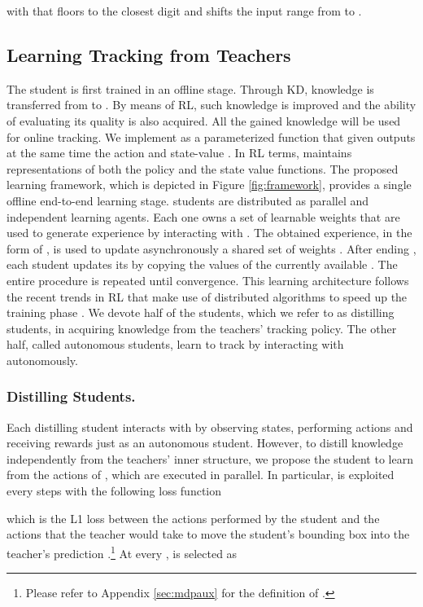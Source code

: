 \documentclass[runningheads]{llncs}
\begin{document}
with
 that
floors to the closest  digit and shifts the input range from  to . 
 
\subsection{Learning Tracking from Teachers}
The student  is first trained in an offline stage. Through KD, knowledge is transferred from  to . By means of RL, such knowledge is improved and the ability of evaluating its quality is also acquired. All the gained knowledge will be used for online tracking.
We implement  as a parameterized function  that given  outputs at the same time the action  and state-value . In RL terms,  maintains representations of both the policy  and the state value   functions. 
The proposed learning framework, which is depicted in Figure \ref{fig:framework}, provides a single offline end-to-end learning stage. 
 students are distributed as parallel and independent learning agents. Each one owns a set of learnable weights  that are used to generate experience by interacting with . The obtained experience,
in the form of , is used to update asynchronously a shared set of weights . After ending , each student updates its  by copying the values of the currently available . The entire procedure is repeated until convergence. This learning architecture follows the recent trends in RL that make use of distributed algorithms to speed up the training phase \cite{Gorila,Mnih2016,IMPALA}. 
We devote half of the students, which we refer to as distilling students, in acquiring knowledge from the teachers' tracking policy. The other half, called autonomous students, learn to track by interacting with  autonomously. 

\subsubsection{Distilling Students.} Each distilling student interacts with  by observing states, performing actions and receiving rewards just as an autonomous student. However, to distill knowledge independently from the teachers' inner structure, we propose the student to learn from the actions of , which are executed in parallel. In particular,  is exploited every  steps with the following loss function

which is the L1 loss between the actions performed by the student and the actions  that the teacher would take to move the student's bounding box  into the teacher's prediction .\footnote{Please refer to Appendix \ref{sec:mdpaux} for the definition of .} At every ,  is selected as 
 
\end{document}
